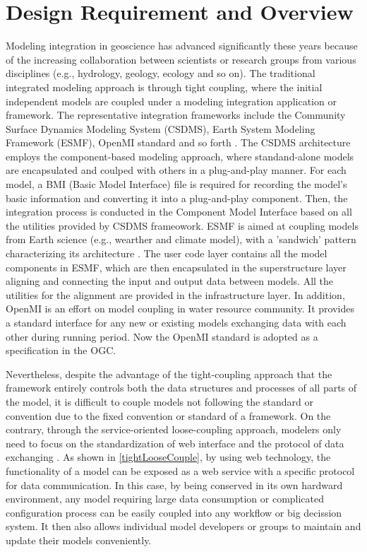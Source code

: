 \documentclass[review]{elsarticle}
\begin{document}
\section{Design Requirement and Overview}
Modeling integration in geoscience has advanced significantly these years because of the increasing collaboration between scientists or research groups from various disciplines (e.g., hydrology, geology, ecology and so on). The traditional integrated modeling approach is through tight coupling, where the initial independent models are coupled under a modeling integration application or framework. The representative integration frameworks include the Community Surface Dynamics Modeling System (CSDMS), Earth System Modeling Framework (ESMF), OpenMI standard and so forth \citep{hill2004, peckham2013, moore2005}. The CSDMS architecture employs the component-based modeling approach, where standand-alone models are encapsulated and coulped with others in a plug-and-play manner. For each model, a BMI (Basic Model Interface) file is required for recording the model's basic information and converting it into a plug-and-play component. Then, the integration process is conducted in the Component Model Interface based on all the utilities provided by CSDMS frameowork. ESMF is aimed at coupling models from Earth science (e.g., wearther and climate model), with a 'sandwich' pattern characterizing its architecture \citep{hill2004}. The user code layer contains all the model components in ESMF, which are then encapsulated in the superstructure layer aligning and connecting the input and output data between models. All the utilities for the alignment are provided in the infrastructure layer. In addition, OpenMI is an effort on model coupling in water resource community. It provides a standard interface for any new or existing models exchanging data with each other during running period. Now the OpenMI standard is adopted as a specification in the OGC.

Nevertheless, despite the advantage of the tight-coupling approach that the framework entirely controls both the data structures and processes of all parts of the model, it is difficult to couple models not following the standard or convention due to the fixed convention or standard of a framework. On the contrary, through the service-oriented loose-coupling approach, modelers only need to focus on the standardization of web interface and the protocol of data exchanging \citep{goodall2011}. As shown in \ref{tightLooseCouple}, by using web technology, the functionality of a model can be exposed as a web service with a specific protocol for data communication. In this case, by being conserved in its own hardward environment, any model requiring large data consumption or complicated configuration process can be easily coupled into any workflow or big decission system. It then also allows individual model developers or groups to maintain and update their models conveniently.
\end{document}

